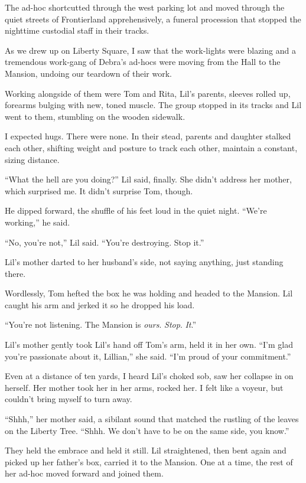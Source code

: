 The ad-hoc shortcutted through the west parking lot and moved
through the quiet streets of Frontierland apprehensively, a funeral
procession that stopped the nighttime custodial staff in their
tracks.

As we drew up on Liberty Square, I saw that the work-lights were
blazing and a tremendous work-gang of Debra's ad-hocs were moving
from the Hall to the Mansion, undoing our teardown of their work.

Working alongside of them were Tom and Rita, Lil's parents, sleeves
rolled up, forearms bulging with new, toned muscle. The group
stopped in its tracks and Lil went to them, stumbling on the wooden
sidewalk.

I expected hugs. There were none. In their stead, parents and
daughter stalked each other, shifting weight and posture to track
each other, maintain a constant, sizing distance.

“What the hell are you doing?” Lil said, finally. She didn't
address her mother, which surprised me. It didn't surprise Tom,
though.

He dipped forward, the shuffle of his feet loud in the quiet night.
“We're working,” he said.

“No, you're not,” Lil said. “You're destroying. Stop it.”

Lil's mother darted to her husband's side, not saying anything,
just standing there.

Wordlessly, Tom hefted the box he was holding and headed to the
Mansion. Lil caught his arm and jerked it so he dropped his load.

“You're not listening. The Mansion is \emph{ours}. \emph{Stop}.
\emph{It}.”

Lil's mother gently took Lil's hand off Tom's arm, held it in her
own. “I'm glad you're passionate about it, Lillian,” she said. “I'm
proud of your commitment.”

Even at a distance of ten yards, I heard Lil's choked sob, saw her
collapse in on herself. Her mother took her in her arms, rocked
her. I felt like a voyeur, but couldn't bring myself to turn away.

“Shhh,” her mother said, a sibilant sound that matched the rustling
of the leaves on the Liberty Tree. “Shhh. We don't have to be on
the same side, you know.”

They held the embrace and held it still. Lil straightened, then
bent again and picked up her father's box, carried it to the
Mansion. One at a time, the rest of her ad-hoc moved forward and
joined them.

